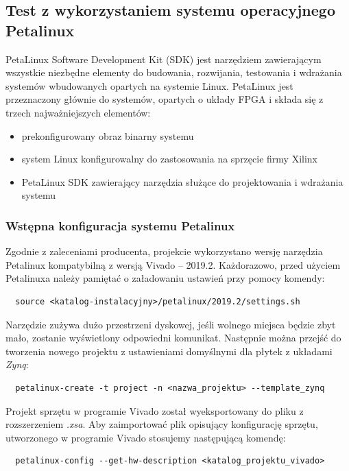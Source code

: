 \subsection{Test z wykorzystaniem systemu operacyjnego Petalinux}

PetaLinux Software Development Kit (SDK) jest narzędziem zawierającym wszystkie niezbędne elementy do budowania,
rozwijania, testowania i wdrażania systemów wbudowanych opartych na systemie Linux. PetaLinux jest przeznaczony głównie 
do systemów, opartych o układy FPGA i składa się z trzech najważniejszych elementów: 

\begin{itemize}
  \item prekonfigurowany obraz binarny systemu 
  \item system Linux konfigurowalny do zastosowania na sprzęcie firmy Xilinx 
  \item PetaLinux SDK zawierający narzędzia służące do projektowania i wdrażania systemu 
\end{itemize}

\subsubsection{Wstępna konfiguracja systemu Petalinux}

Zgodnie z zaleceniami producenta, projekcie wykorzystano wersję narzędzia Petalinux kompatybilną z wersją Vivado -- 
2019.2. Każdorazowo, przed użyciem Petalinuxa należy pamiętać o załadowaniu ustawień przy pomocy komendy:

\begin{verbatim}
  source <katalog-instalacyjny>/petalinux/2019.2/settings.sh
\end{verbatim} 

Narzędzie zużywa dużo przestrzeni dyskowej, jeśli wolnego miejsca będzie zbyt mało, zostanie wyświetlony odpowiedni 
komunikat. Następnie można przejść do tworzenia nowego projektu z ustawieniami domyślnymi dla płytek z układami \emph
{Zynq}:
\begin{verbatim}
  petalinux-create -t project -n <nazwa_projektu> --template_zynq
\end{verbatim}

Projekt sprzętu w programie Vivado został wyeksportowany do pliku z rozszerzeniem \emph{.xsa}. Aby zaimportować plik opisujący konfigurację sprzętu, utworzonego w programie Vivado stosujemy następującą komendę:

\begin{verbatim}  
  petalinux-config --get-hw-description <katalog_projektu_vivado>
\end{verbatim}

